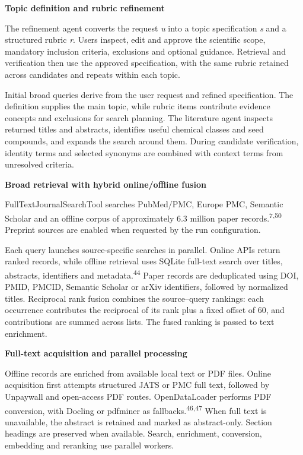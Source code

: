 \documentclass[
]{article}
\begin{document}
\textbf{Topic definition and rubric refinement}

The refinement agent converts the request \emph{u} into a topic specification \emph{s} and a structured rubric \emph{r}. Users inspect, edit and approve the scientific scope, mandatory inclusion criteria, exclusions and optional guidance. Retrieval and verification then use the approved specification, with the same rubric retained across candidates and repeats within each topic.

Initial broad queries derive from the user request and refined specification. The definition supplies the main topic, while rubric items contribute evidence concepts and exclusions for search planning. The literature agent inspects returned titles and abstracts, identifies useful chemical classes and seed compounds, and expands the search around them. During candidate verification, identity terms and selected synonyms are combined with context terms from unresolved criteria.

\textbf{Broad retrieval with hybrid online/offline fusion}

FullTextJournalSearchTool searches PubMed/PMC, Europe PMC, Semantic Scholar and an offline corpus of approximately 6.3 million paper records.\textsuperscript{7,50} Preprint sources are enabled when requested by the run configuration.

Each query launches source-specific searches in parallel. Online APIs return ranked records, while offline retrieval uses SQLite full-text search over titles, abstracts, identifiers and metadata.\textsuperscript{44} Paper records are deduplicated using DOI, PMID, PMCID, Semantic Scholar or arXiv identifiers, followed by normalized titles. Reciprocal rank fusion combines the source--query rankings: each occurrence contributes the reciprocal of its rank plus a fixed offset of 60, and contributions are summed across lists. The fused ranking is passed to text enrichment.

\textbf{Full-text acquisition and parallel processing}

Offline records are enriched from available local text or PDF files. Online acquisition first attempts structured JATS or PMC full text, followed by Unpaywall and open-access PDF routes. OpenDataLoader performs PDF conversion, with Docling or pdfminer as fallbacks.\textsuperscript{46,47} When full text is unavailable, the abstract is retained and marked as abstract-only. Section headings are preserved when available. Search, enrichment, conversion, embedding and reranking use parallel workers.
\end{document}

